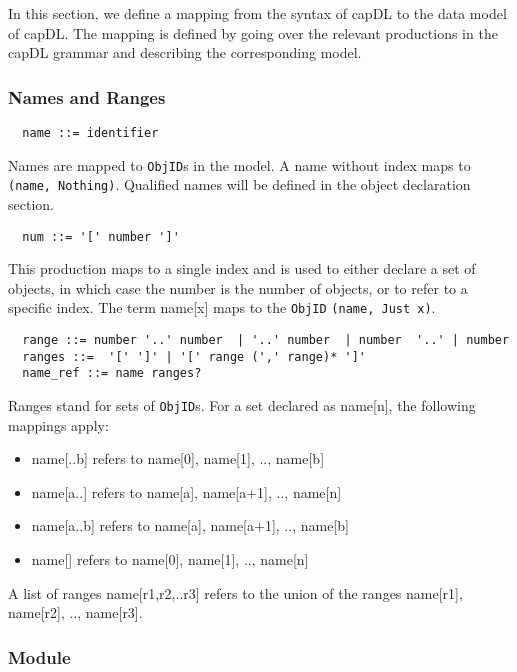 \documentclass[a4paper,11pt]{article}
\begin{document}
In this section, we define a mapping from the syntax of capDL to the data model of capDL. The mapping is defined by going over the relevant productions in the capDL grammar and describing the corresponding model.

\subsubsection{Names and Ranges}

\begin{verbatim}
  name ::= identifier
\end{verbatim}

Names are mapped to \texttt{ObjID}s in the model. A name without index maps to \texttt{(name, Nothing)}. Qualified names will be defined in the object declaration section.

\begin{verbatim}
  num ::= '[' number ']'
\end{verbatim}
This production maps to a single index and is used to either declare a set of objects, in which case the number is the number of objects, or to refer to a specific index. The term name[x] maps to the \texttt{ObjID} \texttt{(name, Just x)}.

\begin{verbatim}
  range ::= number '..' number  | '..' number  | number  '..' | number            
  ranges ::=  '[' ']' | '[' range (',' range)* ']' 
  name_ref ::= name ranges?
\end{verbatim}

Ranges stand for sets of \texttt{ObjID}s. For a set declared as name[n], the following mappings apply:

\begin{itemize}
  \item name[..b] refers to name[0], name[1], .., name[b] 
  \item name[a..] refers to name[a], name[a+1], .., name[n]
  \item name[a..b] refers to name[a], name[a+1], .., name[b]
  \item name[] refers to name[0], name[1], .., name[n] 
\end{itemize}

A list of ranges name[r1,r2,..r3] refers to the union of the ranges name[r1], name[r2], .., name[r3].

\subsubsection{Module}
\end{document}
